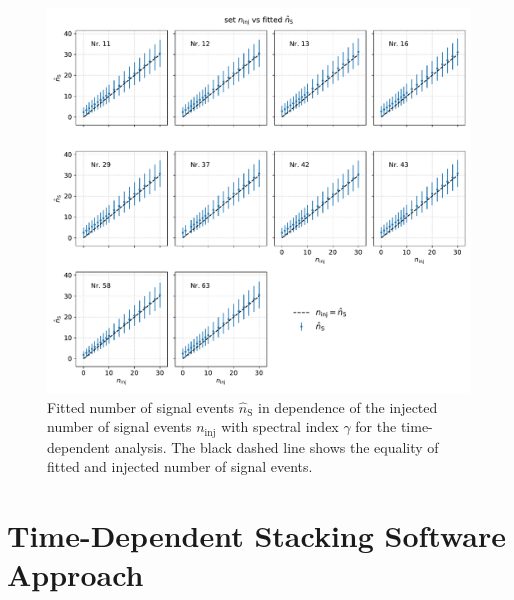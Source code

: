\begin{figure}
    \centering
    \includegraphics[width=\linewidth]{Plots/appendix/ns_fit_time_dep.pdf}
    \caption{Fitted number of signal events $\hat{n}_{\text{S}}$ in dependence of the injected number of signal events $n_\text{inj}$ with spectral index $\gamma$ for the time-dependent analysis. The black dashed line shows the equality of fitted and injected number of signal events.}
    \label{fig:ns_fit_time_dep}
\end{figure}

\section{Time-Dependent Stacking Software Approach}

